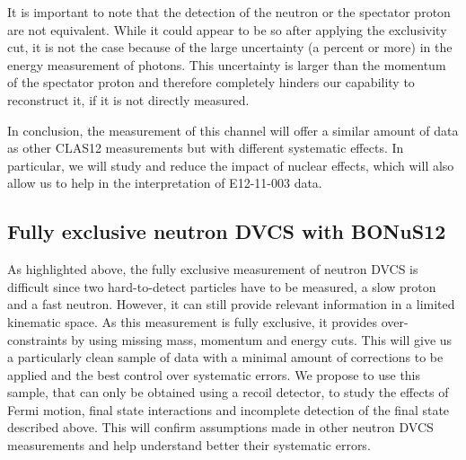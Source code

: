 It is important to note that the detection of the neutron or the spectator 
proton are not equivalent. While it could appear to be so after applying the 
exclusivity cut, it is not the case because of the large uncertainty (a percent 
or more) in the energy measurement of photons. This uncertainty is larger
than the momentum of the spectator proton and therefore completely hinders our 
capability to reconstruct it, if it is not directly measured.

In conclusion, the measurement of this channel will offer a similar amount of 
data as other CLAS12 measurements but with different systematic effects. In 
particular, we will study and reduce the impact of nuclear effects, which will 
also allow us to help in the interpretation of E12-11-003 data.

\subsection{Fully exclusive neutron DVCS with BONuS12}

As highlighted above, the fully exclusive measurement of neutron DVCS is 
difficult since two hard-to-detect particles have to be measured, a slow proton 
and a fast neutron.  However, it can still provide relevant information in a 
limited kinematic space. As this measurement is fully exclusive, it provides 
over-constraints by using missing mass, momentum and energy cuts. This will 
give us a particularly clean sample of data with a minimal amount of 
corrections to be applied and the best control over systematic errors. We 
propose to use this sample, that can only be obtained using a recoil detector, 
to study the effects of Fermi motion, final state interactions and incomplete 
detection of the final state described above. This will confirm assumptions 
made in other neutron DVCS measurements and help understand better their 
systematic errors.



